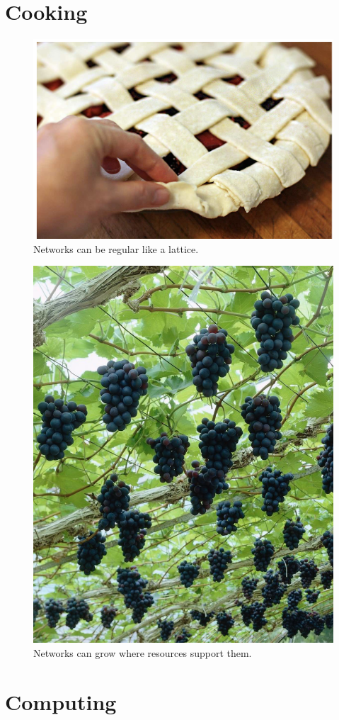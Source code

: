 \documentclass[]{report}
\begin{document}
\section{Cooking}
\begin{figure}
	\centering
	\includegraphics[width=0.7\linewidth]{pieNetwork}
	\caption{Networks can be regular like a lattice.}
	\label{fig:pienetwork}
\end{figure}

\begin{figure}
	\centering
	\includegraphics[width=0.7\linewidth]{grapevineNetwork}
	\caption{Networks can grow where resources support them.}
	\label{fig:grapevinenetwork}
\end{figure}

\section{Computing}
\end{document}

